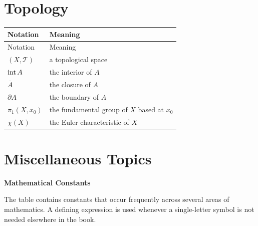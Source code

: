     \section*{Topology}

    {\small
    \renewcommand{\arraystretch}{1.18}
    \begin{longtable}{@{}L{0.27\textwidth}L{0.65\textwidth}@{}}
        \toprule
        Notation & Meaning \\
        \midrule
        \endfirsthead

        \toprule
        Notation & Meaning \\
        \midrule
        \endhead

        \bottomrule
        \endlastfoot

        $(X,\mathcal{T})$ & a topological space \\
        $\operatorname{int} A$ & the interior of $A$ \\
        $\overline{A}$ & the closure of $A$ \\
        $\partial A$ & the boundary of $A$ \\
        $\pi_1(X,x_0)$ & the fundamental group of $X$ based at $x_0$ \\
        $\chi(X)$ & the Euler characteristic of $X$ \\
    \end{longtable}
    }

    \section*{Miscellaneous Topics}

    \noindent\textbf{Mathematical Constants}

    \vspace{0.5em}

    The table contains constants that occur frequently across several areas of
    mathematics. A defining expression is used whenever a single-letter symbol
    is not needed elsewhere in the book.

    \vspace{0.5em}

